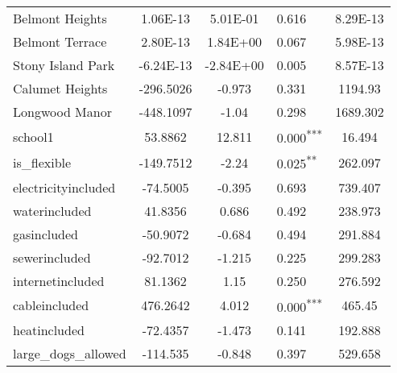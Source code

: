 \documentclass[12pt]{report}
\begin{document}
\begin{longtable}{l S[table-format=6.4] S[table-format=3.4] l S[table-format=4.4]}
	Belmont Heights              & 1.06E-13             & 5.01E-01         & 0.616                      & 8.29E-13                          \\
	Belmont Terrace              & 2.80E-13             & 1.84E+00         & 0.067                      & 5.98E-13                          \\
	Stony Island Park            & -6.24E-13            & -2.84E+00        & 0.005                      & 8.57E-13                          \\
	Calumet Heights              & -296.5026            & -0.973           & 0.331                      & 1194.93                           \\
	Longwood Manor               & -448.1097            & -1.04            & 0.298                      & 1689.302                          \\
	school1                      & 53.8862              & 12.811           & 0.000\textsuperscript{***} & 16.494                            \\
	is\_flexible                 & -149.7512            & -2.24            & 0.025\textsuperscript{**}  & 262.097                           \\
	electricityincluded          & -74.5005             & -0.395           & 0.693                      & 739.407                           \\
	waterincluded                & 41.8356              & 0.686            & 0.492                      & 238.973                           \\
	gasincluded                  & -50.9072             & -0.684           & 0.494                      & 291.884                           \\
	sewerincluded                & -92.7012             & -1.215           & 0.225                      & 299.283                           \\
	internetincluded             & 81.1362              & 1.15             & 0.250                      & 276.592                           \\
	cableincluded                & 476.2642             & 4.012            & 0.000\textsuperscript{***} & 465.45                            \\
	heatincluded                 & -72.4357             & -1.473           & 0.141                      & 192.888                           \\
	large\_dogs\_allowed         & -114.535             & -0.848           & 0.397                      & 529.658                           \\

\end{longtable}
\end{document}
